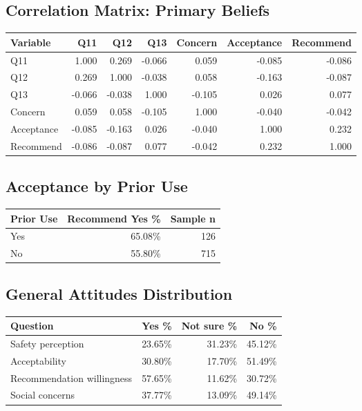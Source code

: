\documentclass[12pt,a4paper]{article}
\begin{document}
\subsection*{Correlation Matrix: Primary Beliefs}
\begin{center}
\small
\begin{tabular}{lrrrrrr}
\hline
\textbf{Variable} & \textbf{Q11} & \textbf{Q12} & \textbf{Q13} & \textbf{Concern} & \textbf{Acceptance} & \textbf{Recommend} \\
\hline
Q11 & 1.000 & 0.269 & -0.066 & 0.059 & -0.085 & -0.086 \\
Q12 & 0.269 & 1.000 & -0.038 & 0.058 & -0.163 & -0.087 \\
Q13 & -0.066 & -0.038 & 1.000 & -0.105 & 0.026 & 0.077 \\
Concern & 0.059 & 0.058 & -0.105 & 1.000 & -0.040 & -0.042 \\
Acceptance & -0.085 & -0.163 & 0.026 & -0.040 & 1.000 & 0.232 \\
Recommend & -0.086 & -0.087 & 0.077 & -0.042 & 0.232 & 1.000 \\
\hline
\end{tabular}
\end{center}
\subsection*{Acceptance by Prior Use}
\begin{center}
\small
\begin{tabular}{lrr}
\hline
\textbf{Prior Use} & \textbf{Recommend Yes \%} & \textbf{Sample n} \\
\hline
Yes & 65.08\% & 126 \\
No & 55.80\% & 715 \\
\hline
\end{tabular}
\end{center}
\subsection*{General Attitudes Distribution}
\begin{center}
\small
\begin{tabular}{lrrr}
\hline
\textbf{Question} & \textbf{Yes \%} & \textbf{Not sure \%} & \textbf{No \%} \\
\hline
Safety perception & 23.65\% & 31.23\% & 45.12\% \\
Acceptability & 30.80\% & 17.70\% & 51.49\% \\
Recommendation willingness & 57.65\% & 11.62\% & 30.72\% \\
Social concerns & 37.77\% & 13.09\% & 49.14\% \\
\hline
\end{tabular}
\end{center}
\newpage
\end{document}
